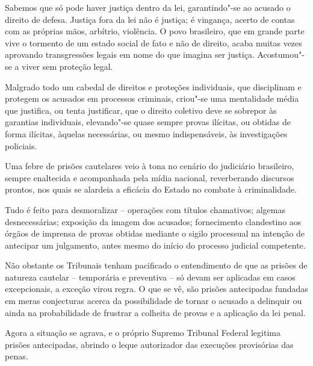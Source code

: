 Sabemos que só pode haver justiça dentro da lei, garantindo"-se ao
acusado o direito de defesa. Justiça fora da lei não é justiça; é
vingança, acerto de contas com as próprias mãos, arbítrio, violência. O
povo brasileiro, que em grande parte vive o tormento de um estado social
de fato e não de direito, acaba muitas vezes aprovando transgressões
legais em nome do que imagina ser justiça. Acostumou"-se a viver sem
proteção legal.

Malgrado todo um cabedal de direitos e proteções individuais, que
disciplinam e protegem os acusados em processos criminais, criou"-se uma
mentalidade média que justifica, ou tenta justificar, que o direito
coletivo deve se sobrepor às garantias individuais, elevando"-se quase
sempre provas ilícitas, ou obtidas de forma ilícitas, àquelas
necessárias, ou mesmo indispensáveis, às investigações policiais.

Uma febre de prisões cautelares veio à tona no cenário do judiciário
brasileiro, sempre enaltecida e acompanhada pela mídia nacional,
reverberando discursos prontos, nos quais se alardeia a eficácia do
Estado no combate à criminalidade.

Tudo é feito para desmoralizar -- operações com títulos chamativos;
algemas desnecessárias; exposição da imagem dos acusados; fornecimento
clandestino aos órgãos de imprensa de provas obtidas mediante o sigilo
processual na intenção de antecipar um julgamento, antes mesmo do início
do processo judicial competente.

Não obstante os Tribunais tenham pacificado o entendimento de que as
prisões de natureza cautelar -- temporária e preventiva -- só devam ser
aplicadas em casos excepcionais, a exceção virou regra. O que se vê, são
prisões antecipadas fundadas em meras conjecturas acerca da
possibilidade de tornar o acusado a delinquir ou ainda na probabilidade
de frustrar a colheita de provas e a aplicação da lei penal.

Agora a situação se agrava, e o próprio Supremo Tribunal Federal
legitima prisões antecipadas, abrindo o leque autorizador das execuções
provisórias das penas.

